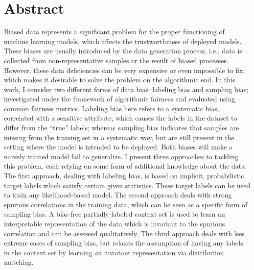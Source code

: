 \begingroup
\let\clearpage\relax
\let\cleardoublepage\relax
\let\cleardoublepage\relax

\chapter*{Abstract}
Biased data represents a significant problem for the proper functioning of machine learning models,
which affects the trustworthiness of deployed models.
These biases are usually introduced by the data generation process,
i.e., data is collected from non-representative samples or the result of biased processes.
However, these data deficiencies can be very expensive or even impossible to fix,
which makes it desirable to solve the problem on the algorithmic end.
In this work, I consider two different forms of data bias:
labeling bias and sampling bias;
investigated under the framework of algorithmic fairness and evaluated using common fairness metrics.
Labeling bias here refers to a systematic bias,
correlated with a sensitive attribute,
which causes the labels in the dataset to differ from the ``true'' labels;
whereas sampling bias indicates that samples are missing from the training set in a systematic way,
but are still present in the setting where the model is intended to be deployed.
Both biases will make a naively trained model fail to generalize.
I present three approaches to tackling this problem, each relying on some form of additional knowledge about the data.
The first approach, dealing with labeling bias, is based on implicit, probabilistic target labels
which satisfy certain given statistics.
These target labels can be used to train any likelihood-based model.
The second approach deals with strong spurious correlations in the training data,
which can be seen as a specific form of sampling bias.
A bias-free partially-labeled context set is used to learn an interpretable representation of the data
which is invariant to the spurious correlation and can be assessed qualitatively.
The third approach deals with less extreme cases of sampling bias,
but relaxes the assumption of having any labels in the context set
by learning an invariant representation via distribution matching.

\endgroup

\vfill
